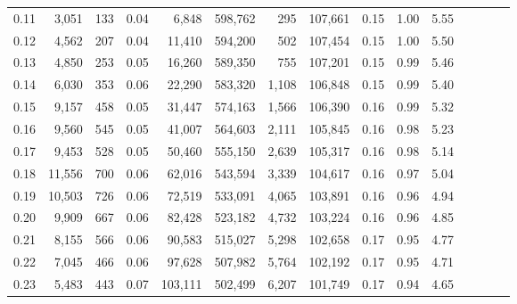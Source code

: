 \begin{tabular}{rrrcrrrrrrrrrrr}
0.11 &   3,051 &    133 &                                       0.04 &    6,848 &  598,762 &      295 &  107,661 &  0.15 &  1.00 &                         5.55 \\
0.12 &   4,562 &    207 &                                       0.04 &   11,410 &  594,200 &      502 &  107,454 &  0.15 &  1.00 &                         5.50 \\
0.13 &   4,850 &    253 &                                       0.05 &   16,260 &  589,350 &      755 &  107,201 &  0.15 &  0.99 &                         5.46 \\
0.14 &   6,030 &    353 &                                       0.06 &   22,290 &  583,320 &    1,108 &  106,848 &  0.15 &  0.99 &                         5.40 \\
0.15 &   9,157 &    458 &                                       0.05 &   31,447 &  574,163 &    1,566 &  106,390 &  0.16 &  0.99 &                         5.32 \\
0.16 &   9,560 &    545 &                                       0.05 &   41,007 &  564,603 &    2,111 &  105,845 &  0.16 &  0.98 &                         5.23 \\
0.17 &   9,453 &    528 &                                       0.05 &   50,460 &  555,150 &    2,639 &  105,317 &  0.16 &  0.98 &                         5.14 \\
0.18 &  11,556 &    700 &                                       0.06 &   62,016 &  543,594 &    3,339 &  104,617 &  0.16 &  0.97 &                         5.04 \\
0.19 &  10,503 &    726 &                                       0.06 &   72,519 &  533,091 &    4,065 &  103,891 &  0.16 &  0.96 &                         4.94 \\
0.20 &   9,909 &    667 &                                       0.06 &   82,428 &  523,182 &    4,732 &  103,224 &  0.16 &  0.96 &                         4.85 \\
0.21 &   8,155 &    566 &                                       0.06 &   90,583 &  515,027 &    5,298 &  102,658 &  0.17 &  0.95 &                         4.77 \\
0.22 &   7,045 &    466 &                                       0.06 &   97,628 &  507,982 &    5,764 &  102,192 &  0.17 &  0.95 &                         4.71 \\
0.23 &   5,483 &    443 &                                       0.07 &  103,111 &  502,499 &    6,207 &  101,749 &  0.17 &  0.94 &                         4.65 \\

\end{tabular}
